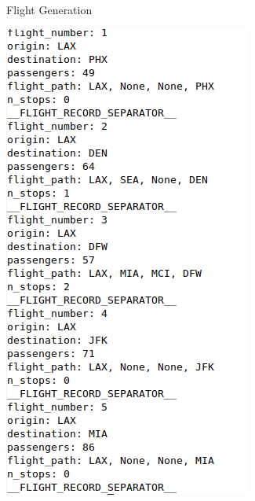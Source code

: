 \documentclass[aspectratio=169,xcolor=dvipsnames]{beamer}
\begin{document}
\begin{frame}{Flight Generation}
    \begin{minipage}{0.45\textwidth}
        \centering
        \includegraphics[width=\textwidth]{images/flight_output.png}
    \end{minipage}
    \hfill
    \begin{minipage}{0.5\textwidth}

\end{minipage}
\end{frame}
\end{document}
